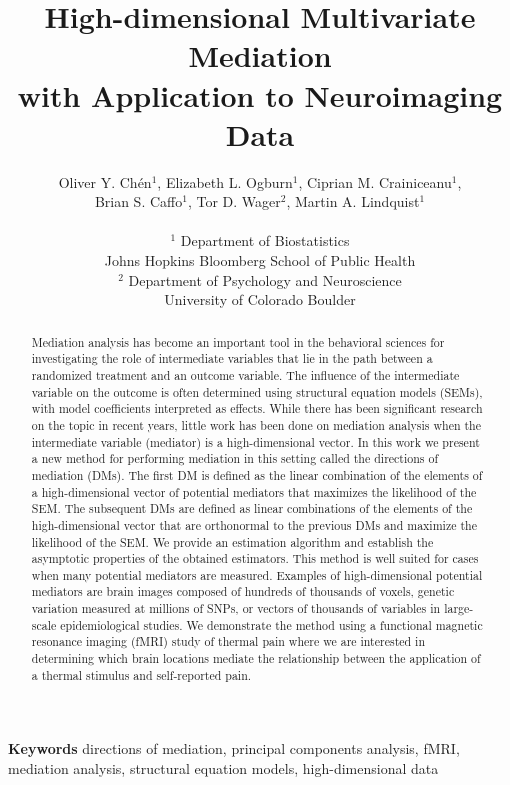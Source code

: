 \documentclass[12pt]{article}
\title{High-dimensional Multivariate Mediation\\
 with Application to Neuroimaging Data}
\author{
Oliver Y. Ch\'en$^1$,  Elizabeth L. Ogburn$^1$, Ciprian M. Crainiceanu$^1$,\\ Brian S. Caffo$^1$, Tor D. Wager$^2$, Martin A. Lindquist$^1$ \\ \\
$^1$ Department of Biostatistics\\
\bigskip
Johns Hopkins Bloomberg School of Public Health \\ 
$^2$ Department of Psychology and Neuroscience\\
University of Colorado Boulder
}
\date{}
\providecommand{\keywords}[1]{\textbf{Keywords} #1}
\begin{document}

\baselineskip24pt


\maketitle 

\newpage
\begin{abstract}
Mediation analysis has become an important tool in the behavioral sciences for investigating the role of intermediate variables that lie in the path between a randomized treatment and an outcome variable. The influence of the intermediate variable on the outcome is often determined using structural equation models (SEMs), with model coefficients interpreted as effects. While there has been significant research on the topic in recent years, little work has been done on mediation analysis when the intermediate variable (mediator) is a high-dimensional vector. In this work we present a new method for performing mediation in this setting called the directions of mediation (DMs). The first DM is defined as the linear combination of the elements of a high-dimensional vector of potential mediators that maximizes the likelihood of the SEM. The subsequent DMs are defined as linear combinations of the elements of the high-dimensional vector that are orthonormal to the previous DMs and maximize the likelihood of the SEM. We provide an estimation algorithm and establish the asymptotic properties of the obtained estimators. This method is well suited for cases when many potential mediators are measured. Examples of high-dimensional potential mediators are brain images composed of hundreds of thousands of voxels, genetic variation measured at millions of SNPs, or vectors of thousands of variables in large-scale epidemiological studies. We demonstrate the method using a functional magnetic resonance imaging (fMRI) study of thermal pain where we are interested in determining which brain locations mediate the relationship between the application of a thermal stimulus and self-reported pain. 

\end{abstract}
\keywords{directions of mediation, principal components analysis, fMRI, mediation analysis, structural equation models, high-dimensional data}
\end{document}
